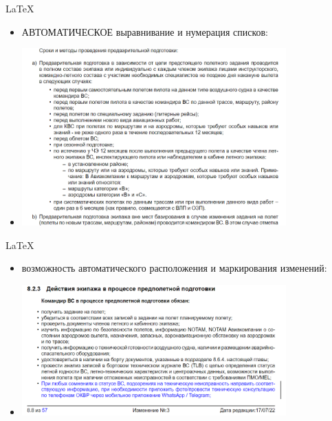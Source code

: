 \documentclass[utf8]{beamer}
\begin{document}
\begin{frame}{LaTeX}  
    \begin{itemize}
        \item <1-> АВТОМАТИЧЕСКОЕ выравнивание и нумерация списков:
        \item <2-> \includegraphics[width=0.8\textwidth]{lt02 - lists.png} 
    \end{itemize}              
\end{frame}

\begin{frame}{LaTeX}  
    \begin{itemize}
        \item <1-> возможность автоматического расположения и маркирования изменений:
        \item <2-> \includegraphics[width=0.8\textwidth]{lt03-changes.png}
    \end{itemize}              
\end{frame}
\end{document}
